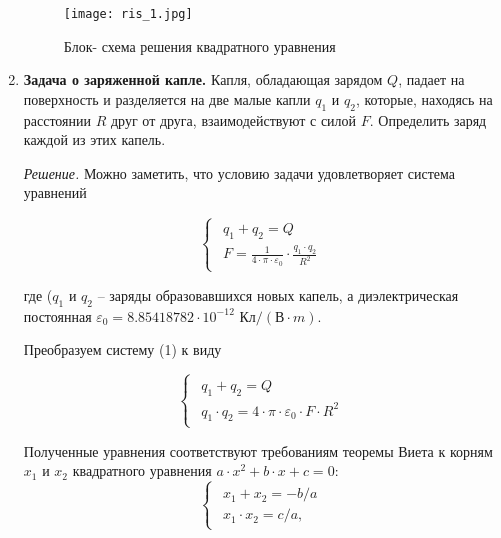 \begin{enumerate}
\begin{figure}[!hb]
\centerline{\texttt{[image: ris\_1.jpg]}}
\caption{Блок- схема решения квадратного уравнения}
\label{ris1}
\end{figure}

  \item {\bf Задача о заряженной капле.}
Капля, обладающая зарядом $Q$, падает на поверхность и раз­деляется на две малые капли $q_1$ и $q_2$, которые, находясь на расстоянии $R$ друг от друга, взаимодействуют с силой $F$. Определить заряд каж­дой из этих капель.

{\it Решение.} Можно заметить, что условию задачи удовлетворяет система уравнений

\begin{equation}
 \begin{cases}
 \begin{aligned}
   q_1 + q_2 = Q\\
   F = \frac{1}{4\cdot\pi\cdot\varepsilon_0}\cdot\frac{q_1\cdot q_2}{R^2}
   \end{aligned}
 \end{cases}
\end{equation}

где ($q_1$ и $q_2$ -- заряды образовавшихся новых капель, 
а диэлектрическая постоянная
 $\varepsilon_0=8.85418782\cdot 10^{-12}$ $\text{Кл}/(\text{В}\cdot m).$

Преобразуем систему (1) к виду  

\begin{equation}
 \begin{cases}
 \begin{aligned}
   q_1 + q_2 = Q\\
   q_1\cdot q_2 = {4\cdot\pi\cdot\varepsilon_0}\cdot F\cdot R^2
      \end{aligned}
 \end{cases}
\end{equation}

Полученные уравнения соответствуют требованиям теоремы Виета к корням $x_1$ и $x_2$ квадратного уравнения 
$a\cdot x^2 + b\cdot x +c = 0:$
\begin{equation}
 \begin{cases}
  \begin{aligned}
   x_1 + x_2 = -b/a\\
   x_1\cdot x_2 = c/a, 
      \end{aligned}
 \end{cases}
\end{equation}


\end{enumerate}
